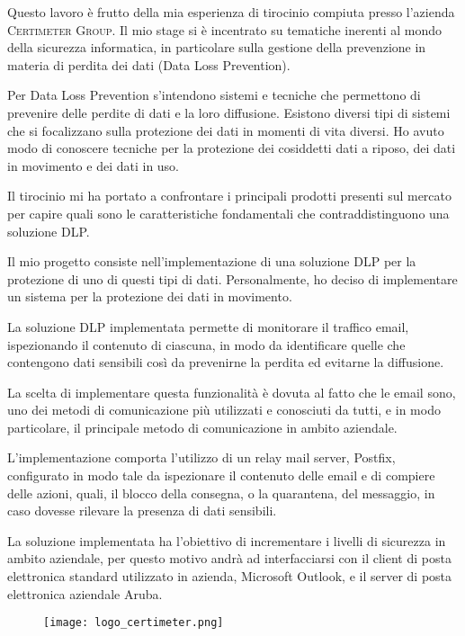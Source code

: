 
Questo lavoro è frutto della mia esperienza di tirocinio compiuta presso l’azienda \textsc{Certimeter Group}. Il mio stage si è incentrato su tematiche inerenti al mondo della sicurezza informatica, in particolare sulla gestione della prevenzione in materia di perdita dei dati (Data Loss Prevention).

Per Data Loss Prevention s’intendono sistemi e tecniche che permettono di prevenire delle perdite di dati e la loro diffusione. Esistono diversi tipi di sistemi che si focalizzano sulla protezione dei dati in momenti di vita diversi. 
Ho avuto modo di conoscere tecniche per la protezione dei cosiddetti dati a riposo, dei dati in movimento e dei dati in uso. 

Il tirocinio mi ha portato a confrontare i principali prodotti presenti sul mercato per capire quali sono le caratteristiche fondamentali che contraddistinguono una soluzione DLP.

Il mio progetto consiste nell’implementazione di una soluzione DLP per la protezione di uno di questi tipi di dati. Personalmente, ho deciso di implementare un sistema per la protezione dei dati in movimento.

La soluzione DLP implementata permette di monitorare il traffico email, ispezionando il contenuto di ciascuna, in modo da identificare quelle che contengono dati sensibili così da prevenirne la perdita ed evitarne la diffusione.

La scelta di implementare questa funzionalità è dovuta al fatto che le email sono, uno dei metodi di comunicazione più utilizzati e conosciuti da tutti, e in modo particolare, il principale metodo di comunicazione in ambito aziendale.

L’implementazione comporta l’utilizzo di un relay mail server, Postfix, configurato in modo tale da ispezionare il contenuto delle email e di compiere delle azioni, quali, il blocco della consegna, o la quarantena, del messaggio, in caso dovesse rilevare la presenza di dati sensibili.

La soluzione implementata ha l’obiettivo di incrementare i livelli di sicurezza in ambito aziendale, per questo motivo andrà ad interfacciarsi con il client di posta elettronica standard utilizzato in azienda, Microsoft Outlook, e il server di posta elettronica aziendale Aruba.




\begin{figure}[b]
    \centering
    \texttt{[image: logo\_certimeter.png]}
\end{figure}